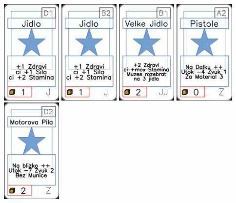 \documentclass[a4paper]{article}
\begin{document}
	\includegraphics[width=3.0cm]{img-1_15}
	\includegraphics[width=3.0cm]{img-1_6}
	\includegraphics[width=3.0cm]{img-1_35}
	\includegraphics[width=3.0cm]{img-1_91}
	\includegraphics[width=3.0cm]{img-1_106}
\end{document}
